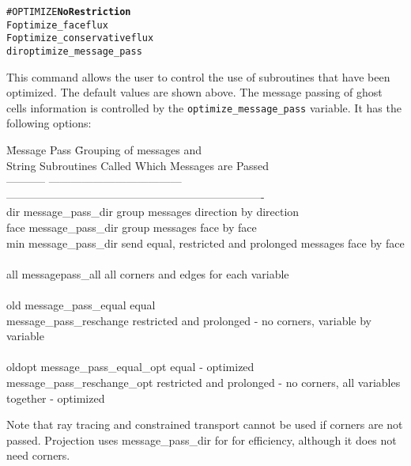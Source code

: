 \begin{alltt}
#OPTIMIZE  \hfill  {\bf No Restriction}
F                      optimize_faceflux
F                      optimize_conservativeflux
dir                    optimize_message_pass
\end{alltt}

This command allows the user to control the use of subroutines that
have been optimized.  The default values are shown above. 
The message passing of ghost cells information
is controlled by the {\tt optimize\_message\_pass} variable. It has the following
options:
\begin{tabbing}
\hspace{0.65in}   \= Message Pass \hspace{1.0in}   \= Grouping of messages and  \\
String           \> Subroutines Called            \> Which Messages are Passed \\      
-----------      \> ------------------------------------  \> ----------------------------------------------------------------------\\
dir              \> message\_pass\_dir            \>  group messages direction by direction \\
face             \> message\_pass\_dir            \>  group messages face by face \\
min              \> message\_pass\_dir            \>  send equal, restricted and prolonged 
                                                      messages face by face \\
\\
all              \> messagepass\_all              \>  all corners and edges for each variable \\
\\
old              \> message\_pass\_equal          \>  equal \\
                 \> message\_pass\_reschange      \>  restricted and prolonged - 
			                              no corners, variable by variable \\
\> \> \\
oldopt           \> message\_pass\_equal\_opt     \>  equal - optimized \\
                 \> message\_pass\_reschange\_opt \>  restricted and prolonged - 
                                                      no corners, all variables together - optimized
\end{tabbing}

Note that ray tracing and constrained transport cannot be used if corners
are not passed.  Projection uses message\_pass\_dir for 
for efficiency, although it does not need corners.
\ \ \\


